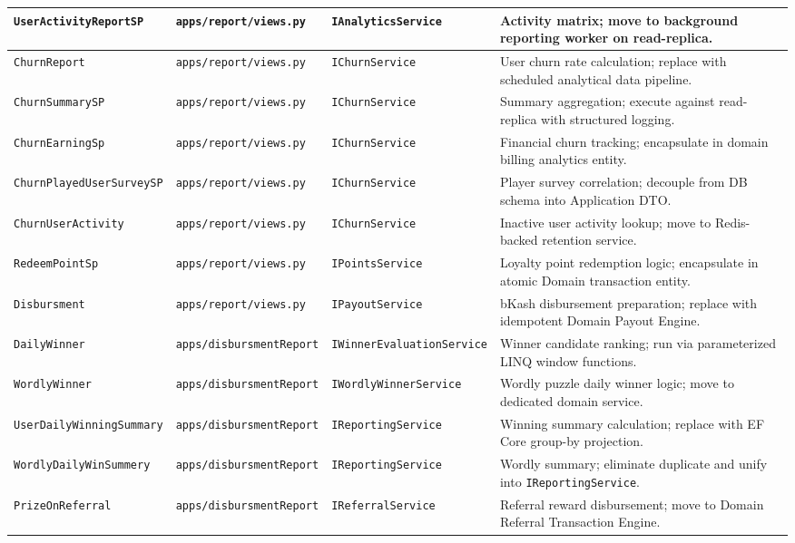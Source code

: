 {\begin{longtable}{|p{3.8cm}|p{3.2cm}|p{3.5cm}|p{3.5cm}|}
\texttt{UserActivityReportSP} & \texttt{apps/report/views.py} & \texttt{IAnalyticsService} & Activity matrix; move to background reporting worker on read-replica. \\ \hline
\texttt{ChurnReport} & \texttt{apps/report/views.py} & \texttt{IChurnService} & User churn rate calculation; replace with scheduled analytical data pipeline. \\ \hline
\texttt{ChurnSummarySP} & \texttt{apps/report/views.py} & \texttt{IChurnService} & Summary aggregation; execute against read-replica with structured logging. \\ \hline
\texttt{ChurnEarningSp} & \texttt{apps/report/views.py} & \texttt{IChurnService} & Financial churn tracking; encapsulate in domain billing analytics entity. \\ \hline
\texttt{ChurnPlayedUserSurveySP} & \texttt{apps/report/views.py} & \texttt{IChurnService} & Player survey correlation; decouple from DB schema into Application DTO. \\ \hline
\texttt{ChurnUserActivity} & \texttt{apps/report/views.py} & \texttt{IChurnService} & Inactive user activity lookup; move to Redis-backed retention service. \\ \hline
\texttt{RedeemPointSp} & \texttt{apps/report/views.py} & \texttt{IPointsService} & Loyalty point redemption logic; encapsulate in atomic Domain transaction entity. \\ \hline
\texttt{Disbursment} & \texttt{apps/report/views.py} & \texttt{IPayoutService} & bKash disbursement preparation; replace with idempotent Domain Payout Engine. \\ \hline
\texttt{DailyWinner} & \texttt{apps/disbursmentReport} & \texttt{IWinnerEvaluationService} & Winner candidate ranking; run via parameterized LINQ window functions. \\ \hline
\texttt{WordlyWinner} & \texttt{apps/disbursmentReport} & \texttt{IWordlyWinnerService} & Wordly puzzle daily winner logic; move to dedicated domain service. \\ \hline
\texttt{UserDailyWinningSummary} & \texttt{apps/disbursmentReport} & \texttt{IReportingService} & Winning summary calculation; replace with EF Core group-by projection. \\ \hline
\texttt{WordlyDailyWinSummery} & \texttt{apps/disbursmentReport} & \texttt{IReportingService} & Wordly summary; eliminate duplicate and unify into \texttt{IReportingService}. \\ \hline
\texttt{PrizeOnReferral} & \texttt{apps/disbursmentReport} & \texttt{IReferralService} & Referral reward disbursement; move to Domain Referral Transaction Engine. \\ \hline

\end{longtable}}
